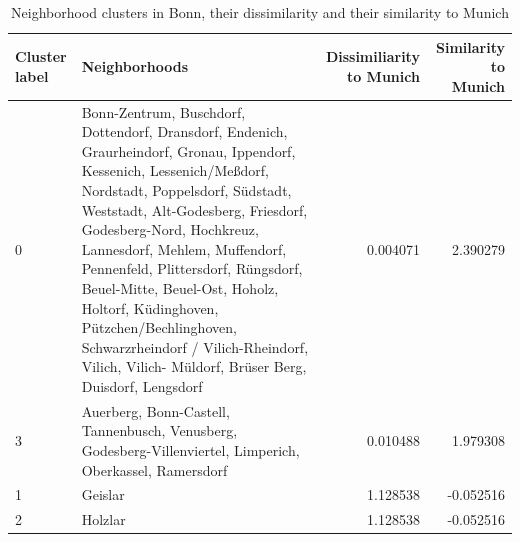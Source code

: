 \documentclass[UKenglish]{scrreprt}
\begin{document}
\begin{table}
	\caption{Neighborhood clusters in Bonn, their dissimilarity and their similarity to Munich}
	\label{tab:clusters}
	\begin{tabular}{lp{5cm}rr}
		\toprule
		Cluster label &                                                                                                                                                                                                                                                                                                                                                                                                                                                                    Neighborhoods &  Dissimiliarity to Munich &  Similarity to Munich \\
		\midrule
		0             &  Bonn-Zentrum, Buschdorf, Dottendorf, Dransdorf, Endenich, Graurheindorf, Gronau, Ippendorf, Kessenich, Lessenich/Meßdorf, Nordstadt, Poppelsdorf, Südstadt, Weststadt, Alt-Godesberg, Friesdorf, Godesberg-Nord, Hochkreuz, Lannesdorf, Mehlem, Muffendorf, Pennenfeld, Plittersdorf, Rüngsdorf, Beuel-Mitte, Beuel-Ost, Hoholz, Holtorf, Küdinghoven, Pützchen/Bechlinghoven, Schwarzrheindorf / Vilich-Rheindorf, Vilich, Vilich- Müldorf, Brüser Berg, Duisdorf, Lengsdorf &                  0.004071 &               2.390279 \\
		3             &                                                                                                                                                                                                                                                                                                                                                                     Auerberg, Bonn-Castell, Tannenbusch, Venusberg, Godesberg-Villenviertel, Limperich, Oberkassel, Ramersdorf &                  0.010488 &               1.979308 \\
		1             &                                                                                                                                                                                                                                                                                                                                                                                                                                                                       Geislar &                  1.128538 &              -0.052516 \\
		2             &                                                                                                                                                                                                                                                                                                                                                                                                                                                                       Holzlar &                  1.128538 &              -0.052516 \\

\end{tabular}
\end{table}
\end{document}
